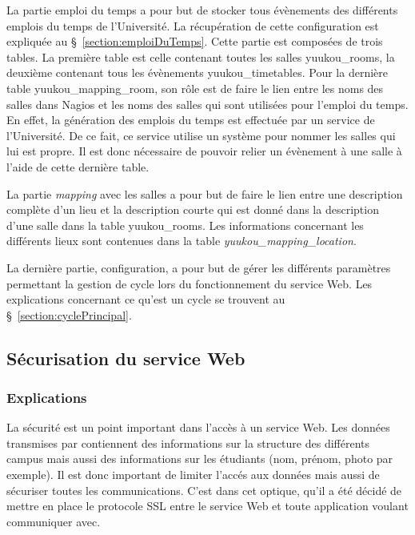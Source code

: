 La partie emploi du temps a pour but de stocker tous \'ev\`enements des diff\'erents emplois du temps de l'Universit\'e.
La r\'ecup\'eration de cette configuration est expliqu\'ee au \S~\ref{section:emploiDuTemps}.
Cette partie est compos\'ees de trois tables.
La premi\`ere table est celle contenant toutes les salles \textsf{yuukou\_rooms}, la deuxi\`eme contenant tous les \'ev\`enements \textsf{yuukou\_timetables}.
Pour la derni\`ere table \textsf{yuukou\_mapping\_room}, son r\^ole est de faire le lien entre les noms des salles dans Nagios et les noms des salles qui sont utilis\'ees pour l'emploi du temps.
En effet, la g\'en\'eration des emplois du temps est effectu\'ee par un service de l'Universit\'e.
De ce fait, ce service utilise un syst\`eme pour nommer les salles qui lui est propre.
Il est donc n\'ecessaire de pouvoir relier un \'ev\`enement \`a une salle \`a l'aide de cette derni\`ere table.

La partie \textit{mapping} avec les salles a pour but de faire le lien entre une description compl\`ete d'un lieu et la description courte qui est donn\'e dans la description d'une salle dans la table \textsf{yuukou\_rooms}.
Les informations concernant les diff\'erents lieux sont contenues dans la table \textit{yuukou\_mapping\_location}.

La derni\`ere partie, configuration, a pour but de g\'erer les diff\'erents param\`etres permettant la gestion de cycle lors du fonctionnement du service Web. 
Les explications concernant ce qu'est un cycle se trouvent au \S~\ref{section:cyclePrincipal}.

\subsection{S\'ecurisation du service Web}
\label{section:securisation}

\subsubsection{Explications}

La s\'ecurit\'e est un point important dans l'acc\`es \`a un service Web. 
Les donn\'ees transmises par \YuukouII{} contiennent des informations sur la structure des diff\'erents campus mais aussi des informations sur les \'etudiants (nom, pr\'enom, photo par exemple).
Il est donc important de limiter l'acc\'es aux donn\'ees mais aussi de s\'ecuriser toutes les communications.
C'est dans cet optique, qu'il a \'et\'e d\'ecid\'e de mettre en place le protocole SSL entre le service Web et toute application voulant communiquer avec.

